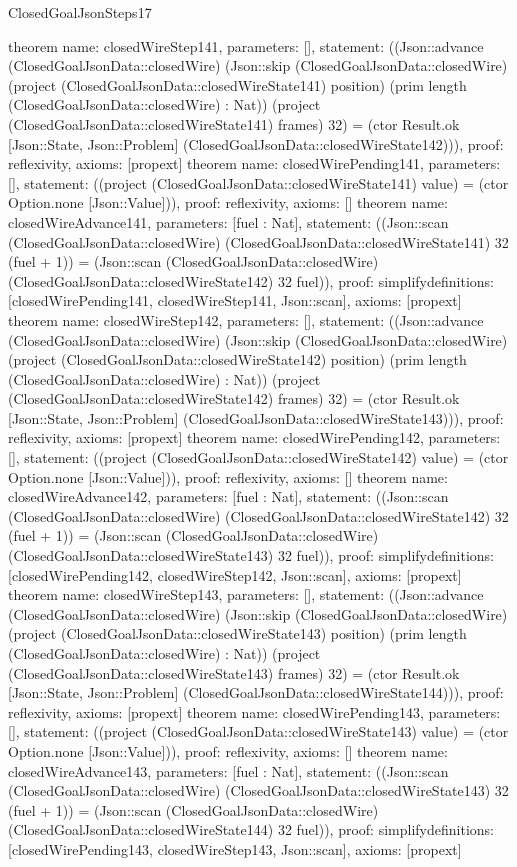 \begin{lexlean}{ClosedGoalJsonSteps17}
\begin{semanticmodule}
{}
theorem{
 name: closedWireStep141, parameters: [],
 statement: ((Json::advance (ClosedGoalJsonData::closedWire) (Json::skip (ClosedGoalJsonData::closedWire) (project (ClosedGoalJsonData::closedWireState141) position) (prim length (ClosedGoalJsonData::closedWire) : Nat)) (project (ClosedGoalJsonData::closedWireState141) frames) 32) = (ctor Result.ok [Json::State, Json::Problem] (ClosedGoalJsonData::closedWireState142))), proof: reflexivity{}, axioms: [propext]
}
theorem{
 name: closedWirePending141, parameters: [],
 statement: ((project (ClosedGoalJsonData::closedWireState141) value) = (ctor Option.none [Json::Value])), proof: reflexivity{}, axioms: []
}
theorem{
 name: closedWireAdvance141, parameters: [fuel : Nat],
 statement: ((Json::scan (ClosedGoalJsonData::closedWire) (ClosedGoalJsonData::closedWireState141) 32 (fuel + 1)) = (Json::scan (ClosedGoalJsonData::closedWire) (ClosedGoalJsonData::closedWireState142) 32 fuel)), proof: simplify{definitions: [closedWirePending141, closedWireStep141, Json::scan]}, axioms: [propext]
}
theorem{
 name: closedWireStep142, parameters: [],
 statement: ((Json::advance (ClosedGoalJsonData::closedWire) (Json::skip (ClosedGoalJsonData::closedWire) (project (ClosedGoalJsonData::closedWireState142) position) (prim length (ClosedGoalJsonData::closedWire) : Nat)) (project (ClosedGoalJsonData::closedWireState142) frames) 32) = (ctor Result.ok [Json::State, Json::Problem] (ClosedGoalJsonData::closedWireState143))), proof: reflexivity{}, axioms: [propext]
}
theorem{
 name: closedWirePending142, parameters: [],
 statement: ((project (ClosedGoalJsonData::closedWireState142) value) = (ctor Option.none [Json::Value])), proof: reflexivity{}, axioms: []
}
theorem{
 name: closedWireAdvance142, parameters: [fuel : Nat],
 statement: ((Json::scan (ClosedGoalJsonData::closedWire) (ClosedGoalJsonData::closedWireState142) 32 (fuel + 1)) = (Json::scan (ClosedGoalJsonData::closedWire) (ClosedGoalJsonData::closedWireState143) 32 fuel)), proof: simplify{definitions: [closedWirePending142, closedWireStep142, Json::scan]}, axioms: [propext]
}
theorem{
 name: closedWireStep143, parameters: [],
 statement: ((Json::advance (ClosedGoalJsonData::closedWire) (Json::skip (ClosedGoalJsonData::closedWire) (project (ClosedGoalJsonData::closedWireState143) position) (prim length (ClosedGoalJsonData::closedWire) : Nat)) (project (ClosedGoalJsonData::closedWireState143) frames) 32) = (ctor Result.ok [Json::State, Json::Problem] (ClosedGoalJsonData::closedWireState144))), proof: reflexivity{}, axioms: [propext]
}
theorem{
 name: closedWirePending143, parameters: [],
 statement: ((project (ClosedGoalJsonData::closedWireState143) value) = (ctor Option.none [Json::Value])), proof: reflexivity{}, axioms: []
}
theorem{
 name: closedWireAdvance143, parameters: [fuel : Nat],
 statement: ((Json::scan (ClosedGoalJsonData::closedWire) (ClosedGoalJsonData::closedWireState143) 32 (fuel + 1)) = (Json::scan (ClosedGoalJsonData::closedWire) (ClosedGoalJsonData::closedWireState144) 32 fuel)), proof: simplify{definitions: [closedWirePending143, closedWireStep143, Json::scan]}, axioms: [propext]
}
\end{semanticmodule}
\end{lexlean}
